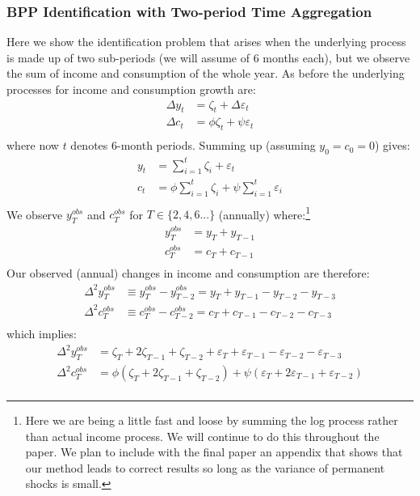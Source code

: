\documentclass[titlepage]{\econtex}\newcommand{\texname}{IncomeUncertainty}
\begin{document}
\subsubsection{BPP Identification with Two-period Time Aggregation} \label{BPP_two_period}
Here we show the identification problem that arises when the underlying process is made up of two sub-periods (we will assume of 6 months each), but we observe the sum of income and consumption of the whole year. As before the underlying processes for income and consumption growth are:
\begin{align*}
\Delta y_t & = \zeta_t + \Delta \varepsilon_t \\
\Delta c_t & = \phi \zeta_t + \psi \varepsilon_t  \\
\end{align*}
where now $t$ denotes 6-month periods. Summing up (assuming $y_0=c_0=0$) gives:
\begin{align*}
y_t & = \sum_{i=1}^t \zeta_i + \varepsilon_t  \\
c_t & = \phi \sum_{i=1}^t \zeta_i + \psi \sum_{i=1}^t \varepsilon_i  \\
\end{align*}
We observe $y^{obs}_T$ and $c^{obs}_T$ for $T \in \{2,4,6...\}$ (annually) where:\footnote{Here we are being a little fast and loose by summing the log process rather than actual income process. We will continue to do this throughout the paper. We plan to include with the final paper an appendix that shows that our method leads to correct results so long as the variance of permanent shocks is small.}
\begin{align*}
y^{obs}_T & = y_T + y_{T-1}  \\
c^{obs}_T & = c_T + c_{T-1}  \\
\end{align*}
Our observed (annual) changes in income and consumption are therefore:
\begin{align*}
\Delta^2 y^{obs}_T & \equiv y^{obs}_T-y^{obs}_{T-2} =  y_T + y_{T-1} - y_{T-2} - y_{T-3} \\
\Delta^2 c^{obs}_T & \equiv c^{obs}_T-c^{obs}_{T-2} =  c_T + c_{T-1} - c_{T-2} - c_{T-3}  \\
\end{align*}
which implies:
\begin{align*}
\Delta^2 y^{obs}_T & = \zeta_T + 2\zeta_{T-1} +\zeta_{T-2} + \varepsilon_T + \varepsilon_{T-1} - \varepsilon_{T-2} - \varepsilon_{T-3} \\
\Delta^2 c^{obs}_T & =  \phi(\zeta_T + 2\zeta_{T-1} +\zeta_{T-2}) + \psi(\varepsilon_T + 2\varepsilon_{T-1} + \varepsilon_{T-2} ) \\
\end{align*}
\end{document}
